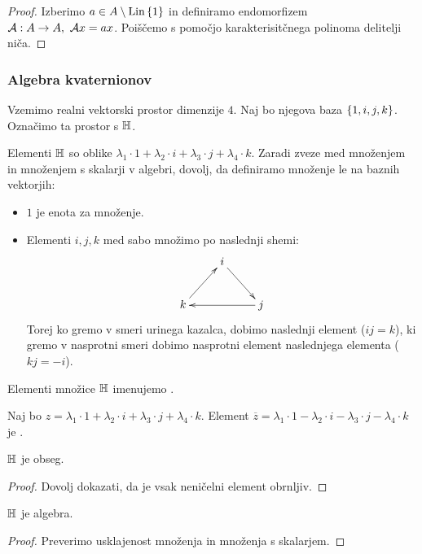 \begin{proof}
    Izberimo $a \in A \setminus \operatorname{Lin} \left\{1\right\}$ in definiramo endomorfizem $\mathcal{A}: A \to A, \ \mathcal{A}x = ax$. Poiščemo s pomočjo karakterisitčnega polinoma delitelji niča.
\end{proof}

\subsubsection*{Algebra kvaternionov}
\begin{primer}
    Vzemimo realni vektorski prostor dimenzije $4$. Naj bo njegova baza $\left\{1, i, j, k\right\}$. Označimo ta prostor s $\mathbb{H}$.
    
    Elementi $\mathbb{H}$ so oblike $\lambda_1 \cdot 1 + \lambda_2 \cdot i + \lambda_3 \cdot j + \lambda_4 \cdot k$. Zaradi zveze med množenjem in množenjem s skalarji v algebri, dovolj, da definiramo množenje le na baznih vektorjih:
    \begin{itemize}
        \item $1$ je enota za množenje.
        \item Elementi $i, j, k$ med sabo množimo po naslednji shemi:
        $$\xymatrix{
            & i \ar@{->}[rd] &  \\
           k \ar@{->}[ru] &  & j \ar@{->}[ll]
           }$$
        Torej ko gremo v smeri urinega kazalca, dobimo naslednji element ($ij = k$), ki gremo v nasprotni smeri dobimo nasprotni element naslednjega elementa ($kj = -i$).
    \end{itemize}
    Elementi množice $\mathbb{H}$ imenujemo .

    Naj bo $z = \lambda_1 \cdot 1 + \lambda_2 \cdot i + \lambda_3 \cdot j + \lambda_4 \cdot k$. Element $\overline{z} = \lambda_1 \cdot 1 - \lambda_2 \cdot i - \lambda_3 \cdot j - \lambda_4 \cdot k$ je .    
\end{primer}

\begin{trditev}
    $\mathbb{H}$ je obseg.
\end{trditev}

\begin{proof}
    Dovolj dokazati, da je vsak neničelni element obrnljiv.
\end{proof}

\begin{trditev}
    $\mathbb{H}$ je algebra.
\end{trditev}

\begin{proof}
    Preverimo usklajenost množenja in množenja s skalarjem.
\end{proof}

